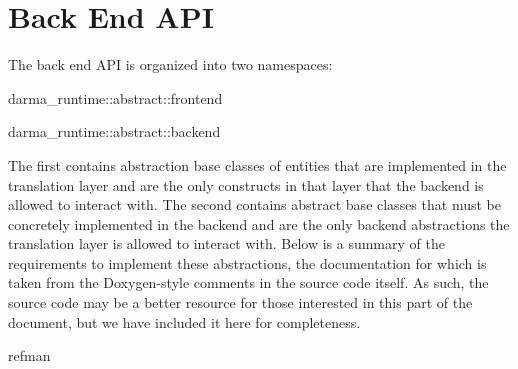 
\chapter{Back End API}
\label{chap:back_end}

The back end API is organized into two namespaces:
\begin{compactenum}
\item {\ttfamily darma\_runtime::abstract::frontend} 
\item {\ttfamily darma\_runtime::abstract::backend}  
\end{compactenum}

The first contains
abstraction base classes of entities that are implemented in the translation
layer and are the only constructs in that layer that the backend is
allowed to interact with.  The second contains abstract base classes that must be concretely implemented in the backend and
are the only backend abstractions the translation layer is allowed to interact
with.  Below is a summary of the requirements to implement these abstractions,
the documentation for which is taken from the Doxygen-style comments in
the source code itself.  As such, the source code may be a better resource for
those interested in this part of the document, but we have included it here for
completeness.  

{refman}
